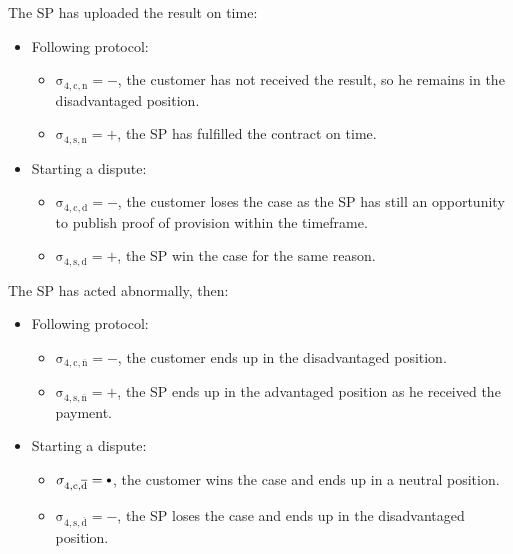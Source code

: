 \documentclass{ieeeaccess}
\newcommand\sbullet[1][.75]{\mathbin{\ThisStyle{\vcenter{\hbox{%
  \scalebox{#1}{$\SavedStyle\bullet$}}}}}%
}
\begin{document}
The SP has uploaded the result on time:

\begin{itemize}
\item
  Following protocol:

  \begin{itemize}
  
  \item
    \(\operatorname{\sigma_{4, c, n} = -}\), the customer has not received the result, so he remains in the disadvantaged position. 
  \item
    \(\operatorname{\sigma_{4, s, n} = +}\), the SP has fulfilled the contract on time.
  \end{itemize}
\item
  Starting a dispute:

  \begin{itemize}
  
  \item
    \(\operatorname{\sigma_{4, c, d} = -}\), the customer loses the case as the SP has still an opportunity to publish proof of provision within the timeframe. 
  \item
    \(\operatorname{\sigma_{4, s, d} = +}\), the SP win the case for the same reason.
  \end{itemize}
\end{itemize}

The SP has acted abnormally, then:

\begin{itemize}
\item
  Following protocol:

  \begin{itemize}
  
  \item
    \(\operatorname{\sigma_{4, c, \overline{n}} = -}\), the customer ends up in the disadvantaged position. 
  \item
    \(\operatorname{\sigma_{4, s, \overline{n}} = +}\), the SP ends up in the advantaged position as he received the payment. 
  \end{itemize}
\item
  Starting a dispute:

  \begin{itemize}
  
  \item
    \(\operatorname{\sigma_{4, c, \overline{d}} = \sbullet}\), the customer wins the case and ends up in a neutral position. 
  \item
    \(\operatorname{\sigma_{4, s, \overline{d}} = -}\), the SP loses the case and ends up in the disadvantaged position. 
  \end{itemize}
\end{itemize}
\end{document}
